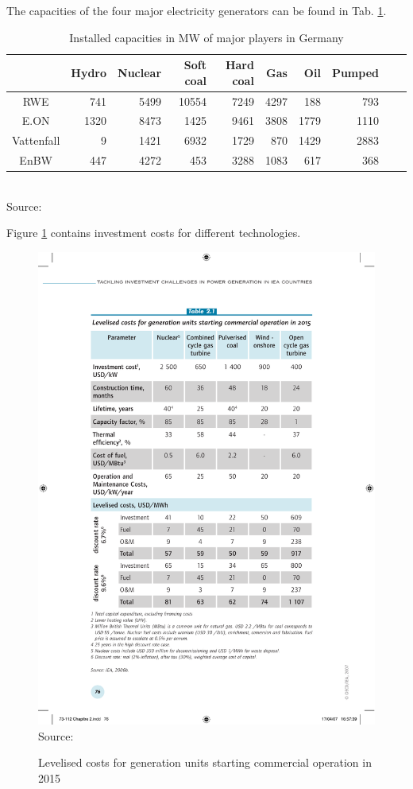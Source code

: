 The capacities of the four major electricity generators can be found in Tab. \ref{tab:majorcapacities}.

\begin{table}[htb]
\centering
\scriptsize
\caption{Installed capacities in MW of major players in Germany}

\begin{tabular}[htb]{crrrrrrrrr}
\hline
           &      Hydro &    Nuclear &  Soft coal &  Hard coal &        Gas &        Oil &     Pumped \\
\hline\hline
       RWE &        741 &       5499 &      10554 &       7249 &       4297 &        188 &        793 \\

      E.ON &       1320 &       8473 &       1425 &       9461 &       3808 &       1779 &       1110 \\

Vattenfall &          9 &       1421 &       6932 &       1729 &        870 &       1429 &       2883 \\

      EnBW &        447 &       4272 &        453 &       3288 &       1083 &        617 &        368 \\
\hline
\end{tabular} 
\label{tab:majorcapacities}
\\
\scriptsize Source: \cite{Ellersdorfer2005}
\end{table}

Figure \ref{fig:investcosts} contains investment costs for different technologies.

\begin{figure}[htb]
  \centering
\caption{Levelised costs for generation units starting commercial operation in 2015}
  \includegraphics[width=.5\textwidth]{germandata/investmentcosts.pdf}
  \label{fig:investcosts}
\\
 \scriptsize Source: \cite{IEA2007c}
\end{figure}


